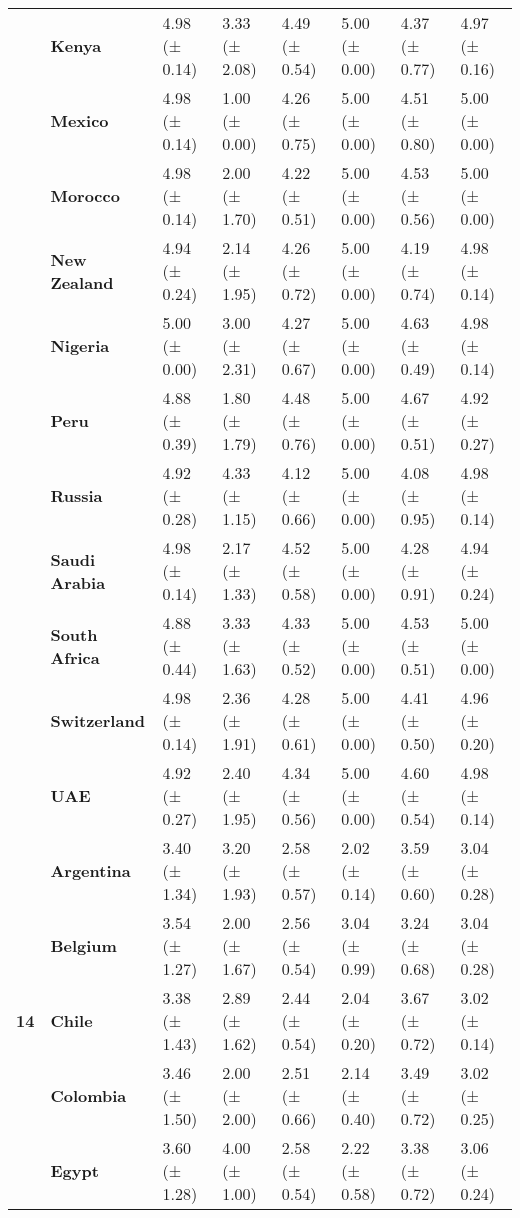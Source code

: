 \begin{longtable}{llllllll}
\textbf{} & \textbf{Kenya} & 4.98 (± 0.14) & 3.33 (± 2.08) & 4.49 (± 0.54) & 5.00 (± 0.00) & 4.37 (± 0.77) & 4.97 (± 0.16) \\
\textbf{} & \textbf{Mexico} & 4.98 (± 0.14) & 1.00 (± 0.00) & 4.26 (± 0.75) & 5.00 (± 0.00) & 4.51 (± 0.80) & 5.00 (± 0.00) \\
\textbf{} & \textbf{Morocco} & 4.98 (± 0.14) & 2.00 (± 1.70) & 4.22 (± 0.51) & 5.00 (± 0.00) & 4.53 (± 0.56) & 5.00 (± 0.00) \\
\textbf{} & \textbf{New Zealand} & 4.94 (± 0.24) & 2.14 (± 1.95) & 4.26 (± 0.72) & 5.00 (± 0.00) & 4.19 (± 0.74) & 4.98 (± 0.14) \\
\textbf{} & \textbf{Nigeria} & 5.00 (± 0.00) & 3.00 (± 2.31) & 4.27 (± 0.67) & 5.00 (± 0.00) & 4.63 (± 0.49) & 4.98 (± 0.14) \\
\textbf{} & \textbf{Peru} & 4.88 (± 0.39) & 1.80 (± 1.79) & 4.48 (± 0.76) & 5.00 (± 0.00) & 4.67 (± 0.51) & 4.92 (± 0.27) \\
\textbf{} & \textbf{Russia} & 4.92 (± 0.28) & 4.33 (± 1.15) & 4.12 (± 0.66) & 5.00 (± 0.00) & 4.08 (± 0.95) & 4.98 (± 0.14) \\
\textbf{} & \textbf{Saudi Arabia} & 4.98 (± 0.14) & 2.17 (± 1.33) & 4.52 (± 0.58) & 5.00 (± 0.00) & 4.28 (± 0.91) & 4.94 (± 0.24) \\
\textbf{} & \textbf{South Africa} & 4.88 (± 0.44) & 3.33 (± 1.63) & 4.33 (± 0.52) & 5.00 (± 0.00) & 4.53 (± 0.51) & 5.00 (± 0.00) \\
\textbf{} & \textbf{Switzerland} & 4.98 (± 0.14) & 2.36 (± 1.91) & 4.28 (± 0.61) & 5.00 (± 0.00) & 4.41 (± 0.50) & 4.96 (± 0.20) \\
\textbf{} & \textbf{UAE} & 4.92 (± 0.27) & 2.40 (± 1.95) & 4.34 (± 0.56) & 5.00 (± 0.00) & 4.60 (± 0.54) & 4.98 (± 0.14) \\
\cline{1-8}
\multirow[t]{19}{*}{\textbf{14}} & \textbf{Argentina} & 3.40 (± 1.34) & 3.20 (± 1.93) & 2.58 (± 0.57) & 2.02 (± 0.14) & 3.59 (± 0.60) & 3.04 (± 0.28) \\
\textbf{} & \textbf{Belgium} & 3.54 (± 1.27) & 2.00 (± 1.67) & 2.56 (± 0.54) & 3.04 (± 0.99) & 3.24 (± 0.68) & 3.04 (± 0.28) \\
\textbf{} & \textbf{Chile} & 3.38 (± 1.43) & 2.89 (± 1.62) & 2.44 (± 0.54) & 2.04 (± 0.20) & 3.67 (± 0.72) & 3.02 (± 0.14) \\
\textbf{} & \textbf{Colombia} & 3.46 (± 1.50) & 2.00 (± 2.00) & 2.51 (± 0.66) & 2.14 (± 0.40) & 3.49 (± 0.72) & 3.02 (± 0.25) \\
\textbf{} & \textbf{Egypt} & 3.60 (± 1.28) & 4.00 (± 1.00) & 2.58 (± 0.54) & 2.22 (± 0.58) & 3.38 (± 0.72) & 3.06 (± 0.24) \\

\end{longtable}
